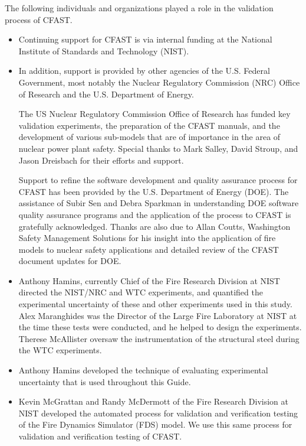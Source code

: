 \documentclass[12pt]{book}
\begin{document}
The following individuals and organizations played a role in the validation process of CFAST.
\begin{itemize}
\item Continuing support for CFAST is via internal funding at the National Institute of Standards and Technology (NIST).

\item In addition, support is provided by other agencies of the U.S. Federal Government, most notably the Nuclear Regulatory Commission (NRC) Office of Research and the U.S. Department of Energy.

The US Nuclear Regulatory Commission Office of Research has funded key validation experiments, the preparation of the CFAST manuals, and the development of various sub-models that are of importance in the area of nuclear power plant safety. Special thanks to Mark Salley, David Stroup, and Jason Dreisbach for their efforts and support.

Support to refine the software development and quality assurance process for CFAST has been provided by the U.S. Department of Energy (DOE). The assistance of Subir Sen and Debra Sparkman in understanding DOE software quality assurance programs and the application of the process to CFAST is gratefully acknowledged.  Thanks are also due to Allan Coutts, Washington Safety Management Solutions for his insight into the application of fire models to nuclear safety applications and detailed review of the CFAST document updates for DOE.

\item Anthony Hamins, currently Chief of the Fire Research Division at NIST directed the NIST/NRC and WTC experiments, and quantified the experimental uncertainty of these and other experiments used in this study. Alex Maranghides was the Director of the Large Fire Laboratory at NIST at the time these tests were conducted, and he helped to design the experiments. Therese McAllister oversaw the instrumentation of the structural steel during the WTC experiments.

\item Anthony Hamins developed the technique of evaluating experimental uncertainty that is used throughout this Guide.

\item Kevin McGrattan and Randy McDermott of the Fire Research Division at NIST developed the automated process for validation and verification testing of the Fire Dynamics Simulator (FDS) model.  We use this same process for validation and verification testing of CFAST.


\end{itemize}
\end{document}
